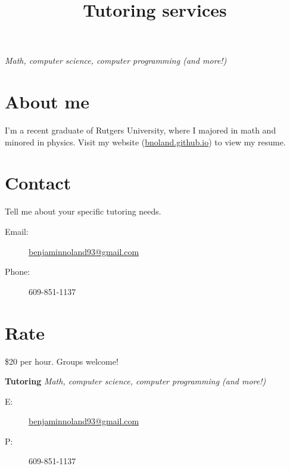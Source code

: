 \documentclass{article}
\title{\fontsize{50}{0}\selectfont \vspace{-2ex}\textbf{Tutoring services}\vspace{-1.5ex}}
\author{}
\date{}
\begin{document}
\maketitle

\Huge

\begin{center}
{\Huge \emph{Math, computer science, computer programming (and more!)}}
\end{center}

\section*{About me}

I'm a recent graduate of Rutgers University, where I majored in math and minored in physics. Visit my website (\url{bnoland.github.io}) to view my resume.

\section*{Contact}

Tell me about your specific tutoring needs.
\medskip
\begin{description}
\item[Email:] \url{benjaminnoland93@gmail.com}
\item[Phone:] 609-851-1137
\end{description}

\section*{Rate}

\$20 per hour. Groups welcome!

\stubs[10]{5.2cm}
{
\small
\textbf{Tutoring} \emph{Math, computer science, computer programming (and more!)}
\begin{description}
\item[E:] \url{benjaminnoland93@gmail.com}
\item[P:] 609-851-1137
\end{description}
}
\end{document}
